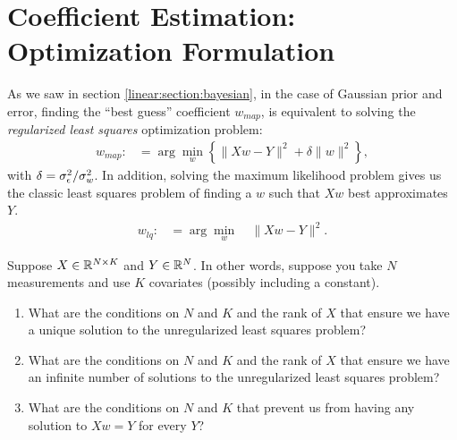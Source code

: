 \section{Coefficient Estimation: Optimization Formulation}
\label{linear:section:optimization}
As we saw in section \ref{linear:section:bayesian}, in the case of Gaussian prior and error, finding the ``best guess'' coefficient $w_{map}$, is equivalent to solving the \emph{regularized least squares} optimization problem:
\begin{align}
  w_{map} :&= \arg\min_w \left\{ \|X w - Y\|^2 + \delta\|w\|^2 \right\},
  \label{linear:align:optimization}
\end{align}
with $\delta = \sigma^2_{\epsilon}/\sigma^2_w$.
In addition, solving the maximum likelihood problem gives us the classic least squares problem of finding a $w$ such that $X w$ best approximates $Y$.
\begin{align}
  w_{lq} :&= \arg\min_w \quad \|X w - Y\|^2.
  \label{linear:align:lsq}
\end{align}

\begin{exercise}
  Suppose $X\in{\mathbb R}^{N\times K}$ and $Y\in{\mathbb R}^N$.  In other words, suppose you take $N$ measurements and use $K$ covariates (possibly including a constant).  
  \begin{enumerate}
    \item What are the conditions on $N$ and $K$ and the rank of $X$ that ensure we have a unique solution to the unregularized least squares problem?
    \item What are the conditions on $N$ and $K$ and the rank of $X$ that ensure we have an infinite number of solutions to the unregularized least squares problem?
    \item What are the conditions on $N$ and $K$ that prevent us from having any solution to $X w=Y$ for every $Y$?
  \end{enumerate}
\end{exercise}

